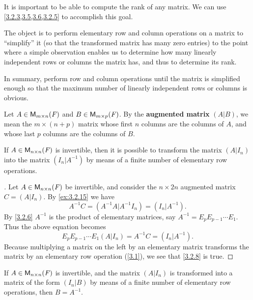 \begin{note}
	It is important to be able to compute the rank of any matrix.
	We can use \cref{3.2.3,3.5,3.6,3.2.5} to accomplish this goal.

	The object is to perform elementary row and column operations on a matrix to ``simplify'' it (so that the transformed matrix has many zero entries) to the point where a simple observation enables us to determine how many linearly independent rows or columns the matrix has, and thus to determine its rank.

	In summary, perform row and column operations until the matrix is simplified enough so that the maximum number of linearly independent rows or columns is obvious.
\end{note}

\begin{defn}\label{3.2.7}
	Let \(A \in \ms\) and \(B \in \ms[m][p][\F]\).
	By the \textbf{augmented matrix} \((A | B)\), we mean the \(m \times (n + p)\) matrix whose first \(n\) columns are the columns of \(A\), and whose last \(p\) columns are the columns of \(B\).
\end{defn}

\begin{cor}\label{3.2.8}
	If \(A \in \ms[n][n][\F]\) is invertible, then it is possible to transform the matrix \((A | I_n)\) into the matrix \((I_n | A^{-1})\) by means of a finite number of elementary row operations.
\end{cor}

\begin{proof}[]
	Let \(A \in \ms[n][n][\F]\) be invertible, and consider the \(n \times 2n\) augmented matrix \(C = (A | I_n)\).
	By \cref{ex:3.2.15} we have
	\[
		A^{-1} C = (A^{-1} A | A^{-1} I_n) = (I_n | A^{-1}).
	\]
	By \cref{3.2.6} \(A^{-1}\) is the product of elementary matrices, say \(A^{-1} = E_p E_{p - 1} \cdots E_1\).
	Thus the above equation becomes
	\[
		E_p E_{p - 1} \cdots E_1 (A | I_n) = A^{-1} C = (I_n | A^{-1}).
	\]
	Because multiplying a matrix on the left by an elementary matrix transforms the matrix by an elementary row operation (\cref{3.1}), we see that \cref{3.2.8} is true.
\end{proof}

\begin{cor}\label{3.2.9}
	If \(A \in \ms[n][n][\F]\) is invertible, and the matrix \((A | I_n)\) is transformed into a matrix of the form \((I_n | B)\) by means of a finite number of elementary row operations, then \(B = A^{-1}\).
\end{cor}

